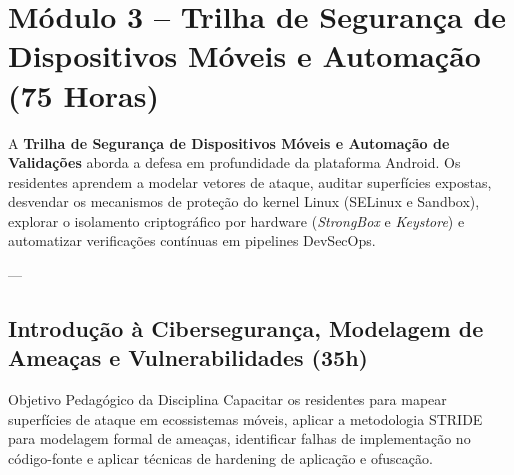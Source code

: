 \chapter{Módulo 3 – Trilha de Segurança de Dispositivos Móveis e Automação (75 Horas)}
\label{chap:modulo3}

A \textbf{Trilha de Segurança de Dispositivos Móveis e Automação de Validações} aborda a defesa em profundidade da plataforma Android. Os residentes aprendem a modelar vetores de ataque, auditar superfícies expostas, desvendar os mecanismos de proteção do kernel Linux (SELinux e Sandbox), explorar o isolamento criptográfico por hardware (\textit{StrongBox} e \textit{Keystore}) e automatizar verificações contínuas em pipelines DevSecOps.

---

\section{Introdução à Cibersegurança, Modelagem de Ameaças e Vulnerabilidades (35h)}

\begin{pedagogico}{Objetivo Pedagógico da Disciplina}
Capacitar os residentes para mapear superfícies de ataque em ecossistemas móveis, aplicar a metodologia STRIDE para modelagem formal de ameaças, identificar falhas de implementação no código-fonte e aplicar técnicas de hardening de aplicação e ofuscação.
\end{pedagogico}

